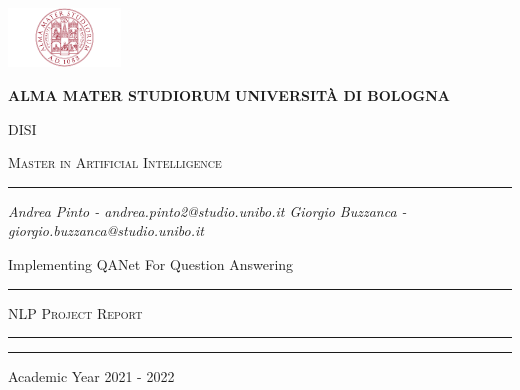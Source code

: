 \begin{titlepage}
\centering 
\includegraphics[width=3.000cm,height=1.571cm]{images/logo.png}

\bigskip

{\Large \textbf{ALMA MATER STUDIORUM}}
{\Large \textbf{UNIVERSIT\`A DI BOLOGNA}}

{\scshape
\large
DISI
}

{\scshape
\normalsize
Master in Artificial Intelligence
}

\bigskip


\hrule


\bigskip


\bigskip


\bigskip


\bigskip

{\itshape
\large
Andrea Pinto - andrea.pinto2@studio.unibo.it
\linebreak
Giorgio Buzzanca - giorgio.buzzanca@studio.unibo.it
\par}


\bigskip


\bigskip


\bigskip


\bigskip

{\centering
\Large
    Implementing QANet For Question Answering
\par}


\bigskip


\bigskip


\bigskip


\bigskip


\bigskip


\bigskip


\begin{minipage}[b]{8 cm}
\hrule

\bigskip

{\centering\scshape 
NLP Project Report
\par}


\bigskip

\hrule
\end{minipage}
\bigskip


\bigskip


\bigskip


\bigskip


\bigskip


\bigskip


\bigskip


\bigskip


\bigskip


\bigskip


\bigskip


\bigskip


\bigskip


\bigskip


\bigskip

\hrule

\bigskip

{\centering
Academic Year 2021 - 2022
\par}
\end{titlepage}
